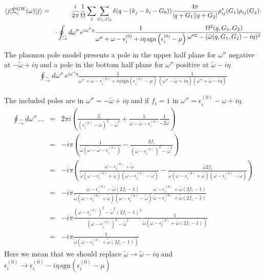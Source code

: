 \documentclass[fleqn]{article}
\begin{document}
\begin{eqnarray*}
\langle j | \tilde{\Sigma}^{\rm GW}_{c}(\omega) | j \rangle
&=&  \frac{i}{2 \pi} \frac{1}{\Omega} \sum_i \sum_{G_1,G_2} \delta(q-(k_j - k_i - G_0))
   \frac{4\pi}{|q+G_1||q+G_2|}
  \rho^*_{ij}(G_1) \rho_{ij}(G_2)  \cdot \\ && \cdot
  \oint_{{\overset{\curvearrowleft}{\rightarrow}}} d\omega'' \, e^{i \omega'' \eta}
   \frac{1}{\omega'' + \omega - \epsilon^{(0)}_i + i \eta \mathrm{\, sgn} \left( \epsilon^{(0)}_i - \mu \right)}
   \frac{\Omega^2(q,G_1,G_2)}{\omega''^2 - (\tilde{\omega}(q,G_1,G_2) - i \eta)^2}
\end{eqnarray*}
The plasmon pole model presents a pole in the upper half plane for $\omega''$ negative
at $-\tilde{\omega}+i\eta$ and a pole in the bottom half plane for $\omega''$ positive
at $\tilde{\omega}-i\eta$
\begin{eqnarray*}
  \oint_{{\overset{\curvearrowleft}{\rightarrow}}} d\omega'' \, e^{i \omega'' \eta}
   \frac{1}{\omega'' + \omega - \epsilon^{(0)}_i + i \eta \mathrm{\, sgn} \left( \epsilon^{(0)}_i - \mu \right)}
   \frac{1}{(\omega'' - \tilde{\omega} + i \eta)(\omega'' + \tilde{\omega} - i \eta)}
\end{eqnarray*}

The included poles are in $\omega'' = - \tilde{\omega} + i \eta$ and if $f_i=1$ in
$\omega'' = \epsilon^{(0)}_i - \omega + i \eta$.
\begin{eqnarray*}
\oint_{{\overset{\curvearrowleft}{\rightarrow}}} d\omega'' \, ... &=&
2 \pi i \left( \frac{f_i}{(\epsilon^{(0)}_i - \omega)^2 - \tilde{\omega}^2} +
             \frac{1}{\omega - \tilde{\omega} - \epsilon^{(0)}_i} \frac{1}{-2\tilde{\omega}} \right)
 \\ &=& - i \pi \left(  \frac{1}{\tilde{\omega} (\omega - \tilde{\omega} - \epsilon^{(0)}_i)} -
    \frac{2 f_i}{(\omega - \epsilon^{(0)}_i)^2 - \tilde{\omega}^2} \right) \\
  &=& - i \pi \left( \frac{\omega - \epsilon^{(0)}_i + \tilde{\omega}}{\tilde{\omega} ( \omega - \epsilon^{(0)}_i + \tilde{\omega})  ( \omega - \epsilon^{(0)}_i - \tilde{\omega})} -
 \frac{\tilde{\omega} 2 f_i}{\tilde{\omega} ( \omega - \epsilon^{(0)}_i + \tilde{\omega})  ( \omega - \epsilon^{(0)}_i - \tilde{\omega})} \right) \\
  &=& - i \pi \frac{\omega - \epsilon^{(0)}_i - \tilde{\omega}(2f_i - 1)}{\tilde{\omega} ( \omega - \epsilon^{(0)}_i + \tilde{\omega})  ( \omega - \epsilon^{(0)}_i - \tilde{\omega})} \frac{\omega - \epsilon^{(0)}_i + \tilde{\omega}(2f_i - 1)}{\omega - \epsilon^{(0)}_i + \tilde{\omega}(2f_i - 1)} \\
  &=& - i \pi \frac{(\omega - \epsilon^{(0)}_i)^2 - \tilde{\omega}^2 (2 f_i - 1)^2}
  {(\omega - \epsilon^{(0)}_i)^2 - \tilde{\omega}^2}
\frac{1}{\tilde{\omega} ( \omega - \epsilon^{(0)}_i + \tilde{\omega} (2 f_i - 1))} \\
  &=& - i \pi \frac{1}{\tilde{\omega} ( \omega - \epsilon^{(0)}_i + \tilde{\omega} (2 f_i - 1))}
\end{eqnarray*}
Here we mean that we should replace $\tilde{\omega} \rightarrow \tilde{\omega} - i\eta$
and $ \epsilon^{(0)}_i \rightarrow \epsilon^{(0)}_i -i \eta \mathrm{\, sgn}(\epsilon^{(0)}_i - \mu)$
\end{document}
